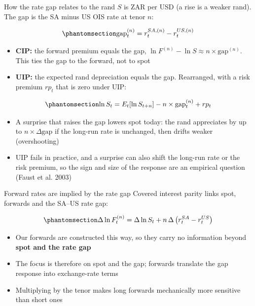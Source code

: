 \documentclass[
  ignorenonframetext,
  aspectratio=141,
]{beamer}
\providecommand{\tightlist}{%
  \setlength{\itemsep}{0pt}\setlength{\parskip}{0pt}}\usepackage{longtable,booktabs,array}
\begin{document}
\begin{frame}{How the rate gap relates to the rand}
\label{how-the-rate-gap-relates-to-the-rand}
\(S\) is ZAR per USD (a rise is a weaker rand). The gap is the SA minus
US OIS rate at tenor \(n\):

\begin{equation}\phantomsection\label{eq-gap}{\text{gap}_t^{(n)} = r_t^{SA,(n)} - r_t^{US,(n)}}\end{equation}

\begin{itemize}
\tightlist
\item
  \textbf{CIP:} the forward premium equals the gap,
  \(\ln F^{(n)} - \ln S \approx n \times \text{gap}^{(n)}\). This ties
  the gap to the forward, not to spot
\item
  \textbf{UIP:} the expected rand depreciation equals the gap.
  Rearranged, with a risk premium \(rp_t\) that is zero under UIP:
\end{itemize}

\begin{equation}\phantomsection\label{eq-uip}{\ln S_t = E_t[\ln S_{t+n}] - n \times \text{gap}_t^{(n)} + rp_t}\end{equation}

\begin{itemize}
\tightlist
\item
  A surprise that raises the gap lowers spot today: the rand appreciates
  by up to \(n \times \Delta\text{gap}\) if the long-run rate is
  unchanged, then drifts weaker (overshooting)
\item
  UIP fails in practice, and a surprise can also shift the long-run rate
  or the risk premium, so the sign and size of the response are an
  empirical question (Faust et al. 2003)
\end{itemize}
\end{frame}

\begin{frame}{Forward rates are implied by the rate gap}
\label{forward-rates-are-implied-by-the-rate-gap}
Covered interest parity links spot, forwards and the SA--US rate gap:

\begin{equation}\phantomsection\label{eq-forward}{\Delta \ln F_t^{(n)} = \Delta \ln S_t + n \, \Delta\left(r_t^{SA} - r_t^{US}\right)}\end{equation}

\begin{itemize}
\tightlist
\item
  Our forwards are constructed this way, so they carry no information
  beyond \textbf{spot and the rate gap}
\item
  The focus is therefore on spot and the gap; forwards translate the gap
  response into exchange-rate terms
\item
  Multiplying by the tenor makes long forwards mechanically more
  sensitive than short ones
\end{itemize}
\end{frame}
\end{document}
